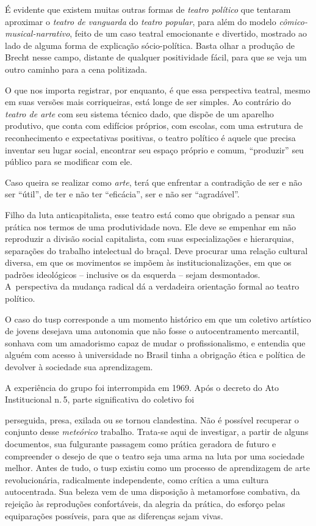 É evidente que existem muitas outras formas de {\it teatro político} que
tentaram aproximar o {\it teatro de vanguarda} do {\it teatro popular},
para além do modelo {\it cômico-musical-narrativo}, feito de um caso
teatral emocionante e divertido, mostrado ao lado de alguma forma de
explicação sócio-política. Basta olhar a produção de Brecht nesse campo,
distante de qualquer positividade fácil, para que se veja um outro
caminho para a cena politizada.

O que nos importa registrar, por enquanto, é que essa perspectiva
teatral, mesmo em suas versões mais corriqueiras, está longe de ser
simples. Ao contrário do {\it teatro de arte} com seu sistema técnico
dado, que dispõe de um aparelho produtivo, que conta com edifícios
próprios, com escolas, com uma estrutura de reconhecimento e
expectativas positivas, o teatro político é aquele que precisa inventar
seu lugar social, encontrar seu espaço próprio e comum, “produzir” seu
público para se modificar com ele.

Caso queira se realizar como {\it arte}, terá que enfrentar a contradição
de ser e não ser “útil”, de ter e não ter “eficácia”, ser e não ser
“agradável”.

Filho da luta anticapitalista, esse teatro está como que obrigado
a pensar sua prática nos termos de uma produtividade nova. Ele deve se
empenhar em não reproduzir a divisão social capitalista, com suas
especializações e hierarquias, separações do trabalho intelectual do
braçal. Deve procurar uma relação cultural diversa, em que os movimentos
se impõem às institucionalizações, em que os padrões ideológicos --
inclusive os da esquerda -- sejam desmontados. A~perspectiva da mudança
radical dá a verdadeira orientação formal ao teatro político.

O caso do {\sc tusp} corresponde a um
momento histórico em que um coletivo artístico de jovens desejava uma
autonomia que não fosse o autocentramento mercantil, sonhava com um
amadorismo capaz de mudar o profissionalismo, e entendia que alguém com
acesso à universidade no Brasil tinha a obrigação ética e política de
devolver à sociedade sua aprendizagem.

A experiência do grupo foi interrompida em 1969. Após o decreto do
Ato Institucional n.\,5, parte significativa do coletivo foi

\column 

\noindent{}perseguida, presa, exilada ou se tornou clandestina. Não é possível
recuperar o conjunto desse {\it meteórico} trabalho. Trata-se aqui de
investigar, a partir de alguns documentos, sua fulgurante passagem como
prática geradora de futuro e compreender o desejo de que o teatro seja
uma arma na luta por uma sociedade melhor. 
Antes de tudo, o {\sc tusp} existiu
como um processo de aprendizagem de arte revolucionária, radicalmente
independente, como crítica a uma cultura autocentrada. Sua beleza vem de
uma disposição à metamorfose combativa, da rejeição às reproduções
confortáveis, da alegria da prática, do esforço pelas equiparações
possíveis, para que as diferenças sejam vivas.

